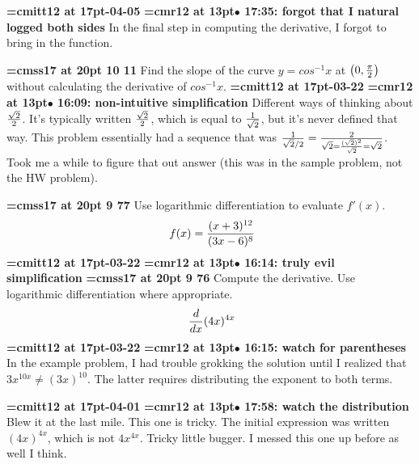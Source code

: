 {\medskip\noindent\bf\font\titlefont=cmitt12 at 17pt-04-05}\medskip
{\smallskip\noindent\bf\font\titlefont=cmr12 at 13pt\titlefont $\bullet$ 17:35: forgot that I natural logged both sides}\smallskip
In the final step in computing the derivative, I forgot to bring in the function.
\par

{\medskip\noindent\bf\font\titlefont=cmss17 at 20pt 10 11}\medskip
Find the slope of the curve $y = cos^{-1} x$ at
$\big(0, {\pi \over 2}\big)$ without calculating the
derivative of $cos^{-1}x$.
{\medskip\noindent\bf\font\titlefont=cmitt12 at 17pt-03-22}\medskip
{\smallskip\noindent\bf\font\titlefont=cmr12 at 13pt\titlefont $\bullet$ 16:09: non-intuitive simplification}\smallskip
Different ways of thinking about $\sqrt{2} \over 2$. It's typically written $\sqrt{2} \over 2$, which is equal to $1 \over \sqrt{2}$, but it's never defined that way. This problem essentially had a sequence that was ${1 \over {\sqrt{2} / 2}} = {2 \over {\sqrt{2}} = {(\sqrt{2})^2 \over \sqrt{2}} = \sqrt{2}}$. Took me a while to figure that out answer (this was in the sample problem, not the HW problem).
\par

{\medskip\noindent\bf\font\titlefont=cmss17 at 20pt 9 77}\medskip
Use logarithmic differentiation to evaluate $f'(x)$.
$$\
f(x) = {
(x + 3)^{12}
\over
(3x - 6)^8
}
$$
{\medskip\noindent\bf\font\titlefont=cmitt12 at 17pt-03-22}\medskip
{\smallskip\noindent\bf\font\titlefont=cmr12 at 13pt\titlefont $\bullet$ 16:14: truly evil simplification}\smallskip
\xrdef{node104}
{\medskip\noindent\bf\font\titlefont=cmss17 at 20pt 9 76}\medskip
Compute the derivative. Use logarithmic differentiation where
appropriate.
$$\
{d \over dx}
(4x)^{4x}
$$
{\medskip\noindent\bf\font\titlefont=cmitt12 at 17pt-03-22}\medskip
{\smallskip\noindent\bf\font\titlefont=cmr12 at 13pt\titlefont $\bullet$ 16:15: watch for parentheses}\smallskip
In the example problem, I had trouble grokking the solution until I realized that $3x^{10x} \ne (3x)^{10}$. The latter requires distributing the exponent to both terms.
\par

{\medskip\noindent\bf\font\titlefont=cmitt12 at 17pt-04-01}\medskip
{\smallskip\noindent\bf\font\titlefont=cmr12 at 13pt\titlefont $\bullet$ 17:58: watch the distribution}\smallskip
Blew it at the last mile. This one is tricky. The initial expression was written $(4x)^{4x}$, which is not $4x^{4x}$. Tricky little bugger. I messed this one up before as well I think.
\par

